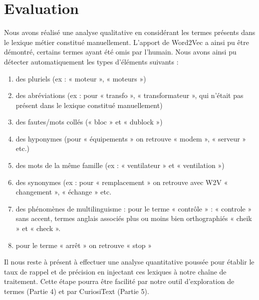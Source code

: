 \section{Evaluation}
Nous avons réalisé une analyse qualitative en considérant les termes présents dans le lexique métier constitué manuellement. L'apport de Word2Vec a ainsi pu être démontré, certains termes ayant été omis par l'humain. Nous avons ainsi pu détecter automatiquement les types d’éléments suivants :

\begin{enumerate}
\item des pluriels (ex : « moteur », « moteurs »)
\item 	des abréviations (ex : pour « transfo », « transformateur », qui n’était pas présent dans le lexique constitué manuellement)
\item 	des fautes/mots collés (« bloc » et « dublock »)
\item 	des hyponymes (pour « équipements » on retrouve « modem », « serveur » etc.)
\item 	des mots de la même famille (ex : « ventilateur » et « ventilation »)
\item 	des synonymes (ex : pour « remplacement » on retrouve avec W2V « changement », « échange » etc.
\item 	des phénomènes de multilinguisme : pour le terme « contrôle » : « controle » sans accent, termes anglais associés plus ou moins bien orthographiés « cheik » et « check ».
\item 	pour le terme « arrêt » on retrouve « stop »

\end{enumerate}

Il nous reste à présent à effectuer une analyse quantitative poussée pour établir le taux de rappel et de précision en injectant ces lexiques à notre chaîne de traitement. Cette étape pourra être facilité par notre outil d’exploration de termes (Partie 4) et par CuriosiText (Partie 5).
